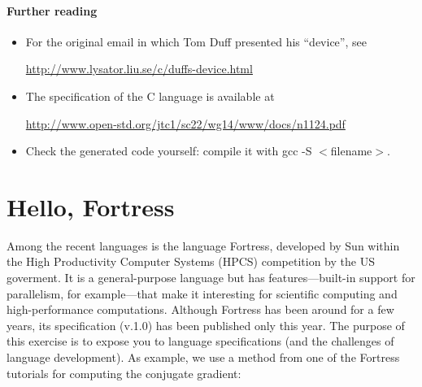 \documentclass{article}
\newcommand{\percent}[1]{\protect \marginpar[l]{\bf [#1 points]}}
\begin{document}
\paragraph{Further reading}
\begin{itemize}
\item For the original email in which Tom Duff presented his ``device'',
see 

\url{http://www.lysator.liu.se/c/duffs-device.html}
\item The specification of the C language is available at 

\url{http://www.open-std.org/jtc1/sc22/wg14/www/docs/n1124.pdf}
\item Check the generated code yourself: compile it
with \textsf{gcc -S $<$filename$>$}.
\end{itemize}


\section{Hello, Fortress \percent{5}}
Among the recent languages is the language \textsf{Fortress}, developed
by Sun within the \textsf{High Productivity Computer Systems (HPCS)}
competition by the US goverment. It is a general-purpose language but has
features---built-in support for parallelism, for example---that make it
interesting for scientific computing and high-performance computations.
Although \textsf{Fortress} has been around for a few years, its
specification (v.1.0) has been published only this year. The purpose of
this exercise is to expose you to language specifications (and the
challenges of language development). As example, we use a method from one
of the Fortress tutorials for computing the conjugate gradient:
%
\end{document}
